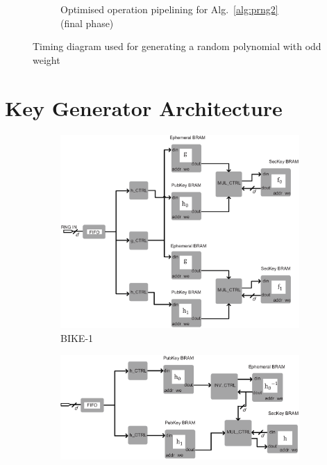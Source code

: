\documentclass[preprint]{iacrtrans}
\begin{document}
\begin{figure}[!tb]
\begin{subfigure}[t]{0.45\textwidth}
\caption{Optimised operation pipelining for Alg.~\ref{alg:prng2} (final phase) }
\label{fig:pipeline_rng3}
\end{subfigure}
\caption{Timing diagram used for generating a random polynomial with odd weight}
\end{figure}

\section{Key Generator Architecture}
\begin{figure}[!tb]
\centering
\begin{subfigure}[t]{0.45\textwidth}\centering
\includegraphics[width=\textwidth]{./fig/BIKE-1.eps}
\caption{BIKE-1}
\label{fig:bike1}
\end{subfigure}
\hspace{1em}
\begin{subfigure}[t]{0.45\textwidth}\centering
\includegraphics[width=\textwidth]{./fig/BIKE-2.eps}

\end{subfigure}
\end{figure}
\end{document}
